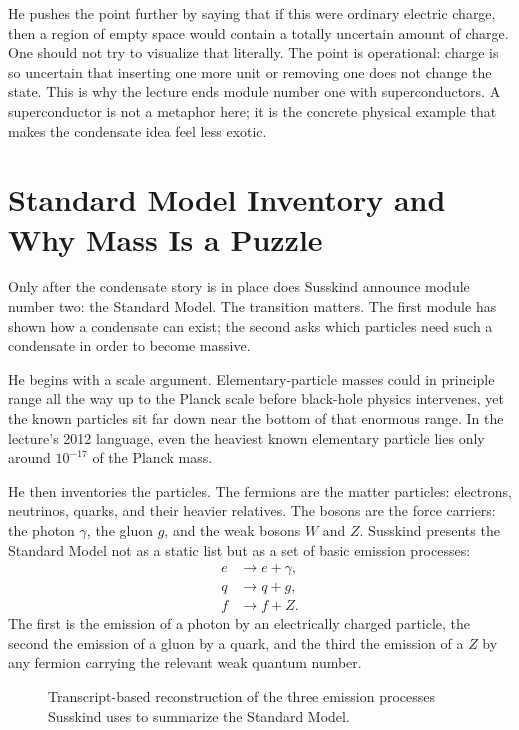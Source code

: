 He pushes the point further by saying that if this were ordinary electric charge, then a region of empty space would contain a totally uncertain amount of charge. One should not try to visualize that literally. The point is operational: charge is so uncertain that inserting one more unit or removing one does not change the state. This is why the lecture ends module number one with superconductors. A superconductor is not a metaphor here; it is the concrete physical example that makes the condensate idea feel less exotic.

\section{Standard Model Inventory and Why Mass Is a Puzzle}

Only after the condensate story is in place does Susskind announce module number two: the Standard Model. The transition matters. The first module has shown how a condensate can exist; the second asks which particles need such a condensate in order to become massive.

He begins with a scale argument. Elementary-particle masses could in principle range all the way up to the Planck scale before black-hole physics intervenes, yet the known particles sit far down near the bottom of that enormous range. In the lecture's 2012 language, even the heaviest known elementary particle lies only around \(10^{-17}\) of the Planck mass.

He then inventories the particles. The fermions are the matter particles: electrons, neutrinos, quarks, and their heavier relatives. The bosons are the force carriers: the photon \(\gamma\), the gluon \(g\), and the weak bosons \(W\) and \(Z\). Susskind presents the Standard Model not as a static list but as a set of basic emission processes:
\begin{align}
e &\to e+\gamma,\\
q &\to q+g,\\
f &\to f+Z.
\end{align}
The first is the emission of a photon by an electrically charged particle, the second the emission of a gluon by a quark, and the third the emission of a \(Z\) by any fermion carrying the relevant weak quantum number.

\begin{figure}
\centering
{}
\caption{Transcript-based reconstruction of the three emission processes Susskind uses to summarize the Standard Model.}
\end{figure}

